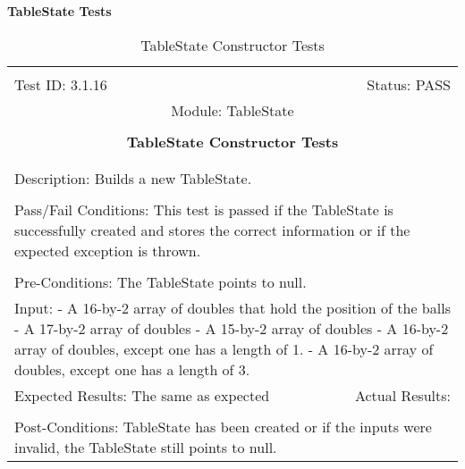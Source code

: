 \documentclass[titlepage]{article}
\begin{document}
\large{\textbf{TableState Tests}}
\begin{center}
\begin{table}[h!]
\begin{tabular}{|l r|}\hline&\\[-2mm]
	Test ID: 3.1.16	&Status: PASS\\[-3mm]
	\multicolumn{2}{|c|}{Module: TableState}\\&\\
	\multicolumn{2}{|c|}{\textbf{\large{TableState Constructor Tests}}}\\&\\\hline&\\[-3mm]
	\multicolumn{2}{|p{\textwidth}|}{Description: Builds a new TableState.}\\[1mm]\hline&\\[-3mm]
	\multicolumn{2}{|p{\textwidth}|}{Pass/Fail Conditions: This test is passed if the TableState is successfully created and stores the correct information or if the expected exception is thrown.}\\[1mm]\hline&\\[-3mm]
	\multicolumn{2}{|p{\textwidth}|}{Pre-Conditions: The TableState points to null.}\\[4mm]
	\multicolumn{2}{|p{\textwidth}|}{Input:\newline
	- A 16-by-2 array of doubles that hold the position of the balls\newline
	- A 17-by-2 array of doubles\newline
	- A 15-by-2 array of doubles\newline
	- A 16-by-2 array of doubles, except one has a length of 1.\newline
	- A 16-by-2 array of doubles, except one has a length of 3.}\\[2mm]\hline
	\multicolumn{1}{|p{0.49\textwidth}}{Expected Results: The same as expected}	&\multicolumn{1}{|p{0.45\textwidth}|}{Actual Results: }\\\hline&\\[-3mm]
	\multicolumn{2}{|p{\textwidth}|}{Post-Conditions: TableState has been created or if the inputs were invalid, the TableState still points to null.}\\\hline
\end{tabular}
\caption{TableState Constructor Tests}
\end{table}
\end{center}
\end{document}
